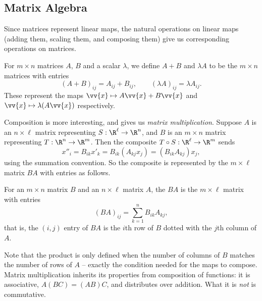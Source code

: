 \subsection{Matrix Algebra}

Since matrices represent linear maps, the natural operations on linear maps (adding them, scaling them, and composing them) give us corresponding operations on matrices.

\begin{definition}
	For $m \times n$ matrices $A$, $B$ and a scalar $\lambda$, we define $A + B$ and $\lambda A$ to be the $m \times n$ matrices with entries
	$$
	(A + B)_{ij} = A_{ij} + B_{ij}, \quad \quad (\lambda A)_{ij} = \lambda A_{ij}.
	$$
	These represent the maps $\vv{x} \mapsto A\vv{x} + B \vv{x}$ and $\vv{x} \mapsto \lambda (A\vv{x})$ respectively.
\end{definition}

Composition is more interesting, and gives us \emph{matrix multiplication}. Suppose $A$ is an $n \times \ell$ matrix representing $S : \R^\ell \rightarrow \R^n$, and $B$ is an $m \times n$ matrix representing $T: \R^n \rightarrow \R^m$. Then the composite $T \circ S : \R^\ell \rightarrow \R^m$ sends
$$
x''_i = B_{ik} x'_k = B_{ik}(A_{kj} x_j) = (B_{ik}A_{kj})x_j,
$$
using the summation convention. So the composite is represented by the $m \times \ell$ matrix $BA$ with entries as follows.

\begin{definition}
	For an $m \times n$ matrix $B$ and an $n \times \ell$ matrix $A$, the  $BA$ is the $m \times \ell$ matrix with entries
	$$
	(BA)_{ij} = \sum_{k = 1}^{n} B_{ik}A_{kj},
	$$
	that is, the $(i, j)$ entry of $BA$ is the $i$th row of $B$ dotted with the $j$th column of $A$.
\end{definition}

Note that the product is only defined when the number of columns of $B$ matches the number of rows of $A$ -- exactly the condition needed for the maps to compose. Matrix multiplication inherits its properties from composition of functions: it is associative, $A(BC) = (AB)C$, and distributes over addition. What it is \emph{not} is commutative.

